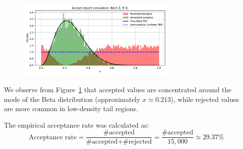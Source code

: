 \begin{figure}[H]
    \centering
    \includegraphics[width=0.7\textwidth]{resources/figures/q7d-beta_accept_reject.pdf}
    \label{fig:q7d}
\end{figure}

We observe from Figure~\ref{fig:q7d} that accepted values are concentrated around the mode of the Beta distribution (approximately $x \approx 0.213$), while rejected values are more common in low-density tail regions.

\medskip
The empirical acceptance rate was calculated as:
\[
\text{Acceptance rate} = \frac{\text{\# accepted}}{\text{\# accepted} + \text{\# rejected}} = \frac{\text{\# accepted}}{15,\!000} \approx 29.37\%
\]













